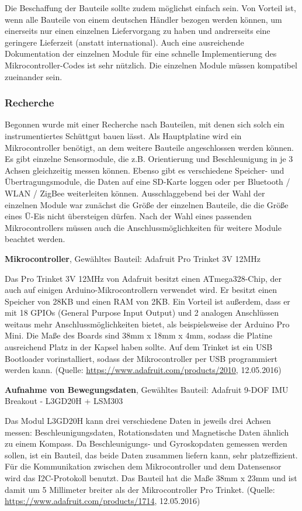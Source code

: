 Die Beschaffung der Bauteile sollte zudem möglichst einfach sein. Von Vorteil ist, wenn alle Bauteile von einem deutschen Händler bezogen werden können, um einerseits nur einen einzelnen Liefervorgang zu haben und andrerseits eine geringere Lieferzeit (anstatt international). Auch eine ausreichende Dokumentation der einzelnen Module für eine schnelle Implementierung des Mikrocontroller-Codes ist sehr nützlich. Die einzelnen Module müssen kompatibel zueinander sein.

\subsubsection{Recherche}
Begonnen wurde mit einer Recherche nach Bauteilen, mit denen sich solch ein instrumentiertes Schüttgut bauen lässt. Als Hauptplatine wird ein Mikrocontroller benötigt, an dem weitere Bauteile angeschlossen werden können. Es gibt einzelne Sensormodule, die z.B. Orientierung und Beschleunigung in je 3 Achsen gleichzeitig messen können. Ebenso gibt es verschiedene Speicher- und Übertragungsmodule, die Daten auf eine SD-Karte loggen oder per Bluetooth / WLAN / ZigBee weiterleiten können. Ausschlaggebend bei der Wahl der einzelnen Module war zunächst die Größe der einzelnen Bauteile, die die Größe eines Ü-Eis nicht übersteigen dürfen. Nach der Wahl eines passenden Mikrocontrollers müssen auch die Anschlussmöglichkeiten für weitere Module beachtet werden.

\textbf{Mikrocontroller}, Gewähltes Bauteil: Adafruit Pro Trinket 3V 12MHz

Das Pro Trinket 3V 12MHz von Adafruit besitzt einen ATmega328-Chip, der auch auf einigen Arduino-Mikrocontrollern verwendet wird. Er besitzt einen Speicher von 28KB und einen RAM von 2KB. Ein Vorteil ist außerdem, dass er mit 18 GPIOs (General Purpose Input Output) und 2 analogen Anschlüssen weitaus mehr Anschlussmöglichkeiten bietet, als beispielsweise der Arduino Pro Mini. Die Maße des Boards sind  38mm x 18mm x 4mm, sodass die Platine ausreichend Platz in der Kapsel haben sollte. Auf dem Trinket ist ein USB Bootloader vorinstalliert, sodass der Mikrocontroller per USB programmiert werden kann. (Quelle: \url{https://www.adafruit.com/products/2010}, 12.05.2016)

\textbf{Aufnahme von Bewegungsdaten}, Gewähltes Bauteil: Adafruit 9-DOF IMU Breakout - L3GD20H + LSM303

Das Modul L3GD20H kann drei verschiedene Daten in jeweils drei Achsen messen: Beschleunigungsdaten, Rotationsdaten und Magnetische Daten ähnlich zu einem Kompass. Da Beschleunigungs- und Gyroskopdaten gemessen werden sollen, ist ein Bauteil, das beide Daten zusammen liefern kann, sehr platzeffizient. Für die Kommunikation zwischen dem Mikrocontroller und dem Datensensor wird das I2C-Protokoll benutzt. Das Bauteil hat die Maße 38mm x 23mm und ist damit um 5 Millimeter breiter als der Mikrocontroller Pro Trinket. (Quelle: \url{https://www.adafruit.com/products/1714}, 12.05.2016)

